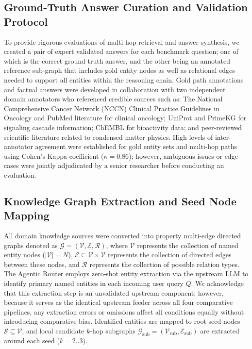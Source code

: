 \documentclass{llncs}
\begin{document}
\subsection{Ground-Truth Answer Curation and Validation Protocol}
To provide rigorous evaluations of multi-hop retrieval and answer synthesis, we created a pair of expert validated answers for each benchmark question; one of which is the correct ground truth answer, and the other being an annotated reference sub-graph that includes gold entity nodes as well as relational edges needed to support all entities within the reasoning chain. Gold path annotations and factual answers were developed in collaboration with two independent domain annotators who referenced credible sources such as: The National Comprehensive Cancer Network (NCCN) Clinical Practice Guidelines in Oncology and PubMed literature for clinical oncology; UniProt and PrimeKG \cite{chandak2023building} for signaling cascade information; ChEMBL \cite{gaulton2012chembl} for bioactivity data; and peer-reviewed scientific literature related to condensed matter physics. High levels of inter-annotator agreement were established for gold entity sets and multi-hop paths using Cohen's Kappa coefficient ($\kappa=0.86$); however, ambiguous issues or edge cases were jointly adjudicated by a senior researcher before conducting an evaluation.

\subsection{Knowledge Graph Extraction and Seed Node Mapping}
All domain knowledge sources were converted into property multi-edge directed graphs denoted as $\mathcal{G} = (\mathcal{V}, \mathcal{E}, \mathcal{R})$, where $\mathcal{V}$ represents the collection of named entity nodes ($|\mathcal{V}|=N$), $\mathcal{E} \subseteq \mathcal{V} \times \mathcal{V}$ represents the collection of directed edges between these nodes, and $\mathcal{R}$ represents the collection of possible relation types. The Agentic Router employs zero-shot entity extraction via the upstream LLM to identify primary named entities in each incoming user query $Q$. We acknowledge that this extraction step is an unvalidated upstream component; however, because it serves as the identical upstream feeder across all four comparative pipelines, any extraction errors or omissions affect all conditions equally without introducing comparative bias. Identified entities are mapped to root seed nodes $\mathcal{S} \subseteq \mathcal{V}$, and local candidate $k$-hop subgraphs $\mathcal{G}_{\text{sub}} = (\mathcal{V}_{\text{sub}}, \mathcal{E}_{\text{sub}})$ are extracted around each seed ($k = 2..3$).
\end{document}
